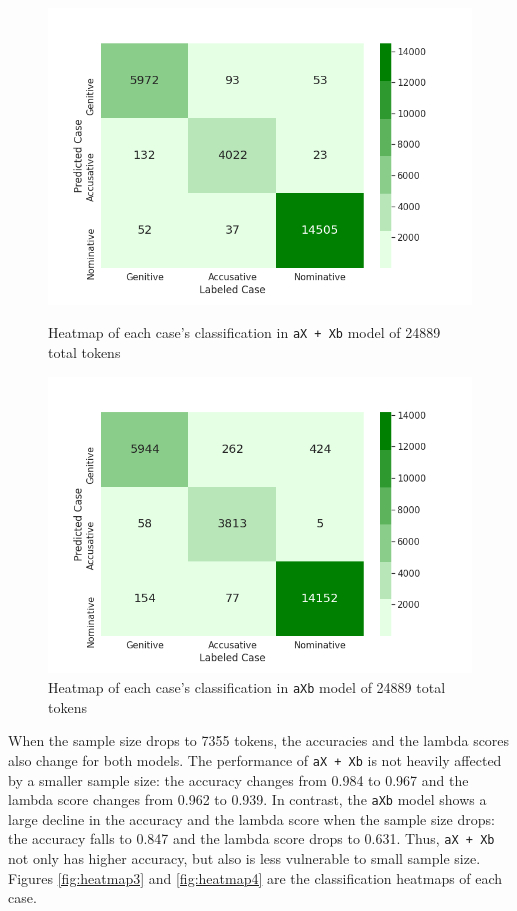 \FloatBarrier
\begin{figure}[!h]
    \centering
    \includegraphics[scale = .45]{graph/aXXbheatmap24889.png}
    \caption{Heatmap of each case's classification in \texttt{aX + Xb} model of 24889 total tokens}
    \label{fig:heatmap1}
    \includegraphics[scale =.45]{graph/aXbheatmap24889.png}
    \caption{Heatmap of each case's classification in \texttt{aXb} model of 24889 total tokens}
    \label{fig:heatmap2}
\end{figure}
\FloatBarrier

When the sample size drops to 7355 tokens, the accuracies and the lambda scores also change for both models. The performance of \texttt{aX + Xb} is not heavily affected by a smaller sample size: the accuracy changes from 0.984 to 0.967 and the lambda score changes from 0.962 to 0.939. In contrast, the \texttt{aXb} model shows a large decline in the accuracy and the lambda score when the sample size drops: the accuracy falls to 0.847 and the lambda score drops to 0.631. Thus, \texttt{aX + Xb} not only has higher accuracy, but also is less vulnerable to small sample size. Figures \ref{fig:heatmap3} and \ref{fig:heatmap4} are the classification heatmaps of each case.

